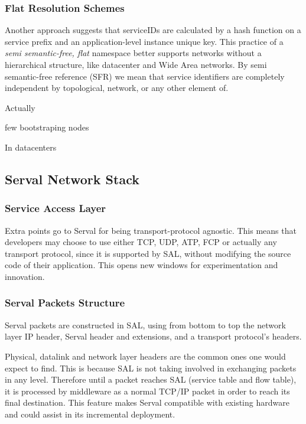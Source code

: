 \subsubsection{Flat Resolution Schemes}
Another approach suggests that serviceIDs are calculated by a hash function on a service prefix and an application-level instance unique key.
This practice of a \emph{semi semantic-free, flat} namespace better supports networks without a hierarchical structure, like datacenter and Wide Area networks.
By semi semantic-free\cite{Walfisha2004} reference (SFR) we mean that service identifiers are completely independent by topological, network, or any other element of.

Actually 

few bootstraping nodes

In datacenters



\subsection{Serval Network Stack}



\subsubsection{Service Access Layer}
Extra points go to Serval for being transport-protocol agnostic.
This means that developers may choose to use either TCP, UDP, ATP, FCP or actually any transport protocol, since it is supported by SAL, without modifying the source code of their application.
This opens new windows for experimentation and innovation.



\subsubsection{Serval Packets Structure}
Serval packets are constructed in SAL, using from bottom to top the network layer IP header, Serval header and extensions, and a transport protocol's headers.

Physical, datalink and network layer headers are the common ones one would expect to find.
This is because SAL is not taking involved in exchanging packets in any level.
Therefore until a packet reaches SAL (service table and flow table), it is processed by middleware as a normal TCP/IP packet in order to reach its final destination.
This feature makes Serval compatible with existing hardware and could assist in its incremental deployment.

